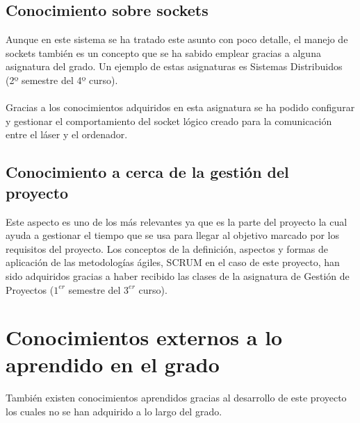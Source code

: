 \subsection{Conocimiento sobre sockets}
Aunque en este sistema se ha tratado este asunto con poco detalle, el manejo de sockets también es un concepto que se ha sabido emplear gracias a alguna asignatura del grado. Un ejemplo de estas asignaturas es Sistemas Distribuidos (2º semestre del 4º curso).\\
\\
Gracias a los conocimientos adquiridos en esta asignatura se ha podido configurar y gestionar el comportamiento del socket lógico creado para la comunicación entre el láser y el ordenador.\\

\subsection{Conocimiento a cerca de la gestión del proyecto}
Este aspecto es uno de los más relevantes ya que es la parte del proyecto la cual ayuda a gestionar el tiempo que se usa para llegar al objetivo marcado por los requisitos del proyecto. Los conceptos de la definición, aspectos y formas de aplicación de las metodologías ágiles, SCRUM en el caso de este proyecto, han sido adquiridos gracias a haber recibido las clases de la asignatura de Gestión de Proyectos ($1^{er}$ semestre del $3^{er}$ curso).\\

\section{Conocimientos externos a lo aprendido en el grado}

También existen conocimientos aprendidos gracias al desarrollo de este proyecto los cuales no se han adquirido a lo largo del grado.\\

